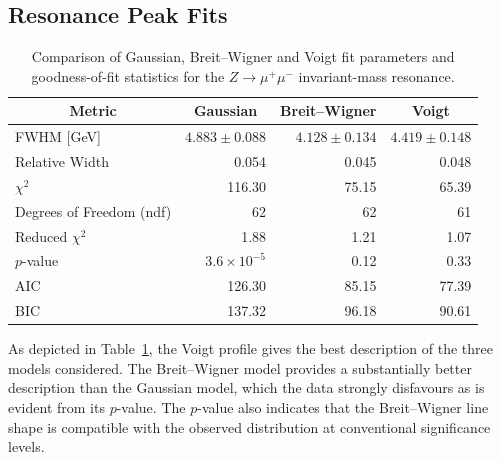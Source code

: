 \documentclass[11pt, a4paper]{article}
\numberwithin{equation}{section}
\begin{document}
\FloatBarrier
\subsection{Resonance Peak Fits}

\begin{table}[H]
    \begin{center}
    \begin{threeparttable}
        \caption{Comparison of Gaussian, Breit--Wigner and Voigt fit parameters and goodness-of-fit statistics for the $Z \to \mu^+ \mu^-$ invariant-mass resonance.}
        \label{tab:statistical_comparison_Z_peaks}   
            \begin{tabular}{ | l | r | r | r | }
                \hline
                \multicolumn{1}{|c|}{\textbf{Metric}} & \multicolumn{1}{|c|}{\textbf{Gaussian}} & \multicolumn{1}{|c|}{\textbf{Breit--Wigner}} & \multicolumn{1}{|c|}{\textbf{Voigt}}\\ \hline
                FWHM [GeV] & $4.883 \pm 0.088$ & $4.128 \pm 0.134$ & $4.419 \pm 0.148$ \\
                Relative Width & 0.054 & 0.045 & 0.048 \\
                $\chi^2$ & 116.30 & 75.15 & 65.39 \\
                Degrees of Freedom (ndf) & 62 & 62 & 61 \\
                Reduced $\chi^2$ & 1.88 & 1.21 & 1.07 \\
                $p$-value & $3.6 \times 10^{-5}$ & 0.12 & 0.33 \\
                AIC & 126.30 & 85.15 & 77.39 \\
                BIC & 137.32 & 96.18 & 90.61 \\
                \hline
        \end{tabular}
    \end{threeparttable}
    \end{center}
\end{table}

As depicted in Table~\ref{tab:statistical_comparison_Z_peaks}, the Voigt profile gives the best description of the three models considered. The Breit--Wigner model provides a substantially better description than the Gaussian model, which the data strongly disfavours as is evident from its $p$-value. The $p$-value also indicates that the Breit--Wigner line shape is compatible with the observed distribution at conventional significance levels.
\end{document}
